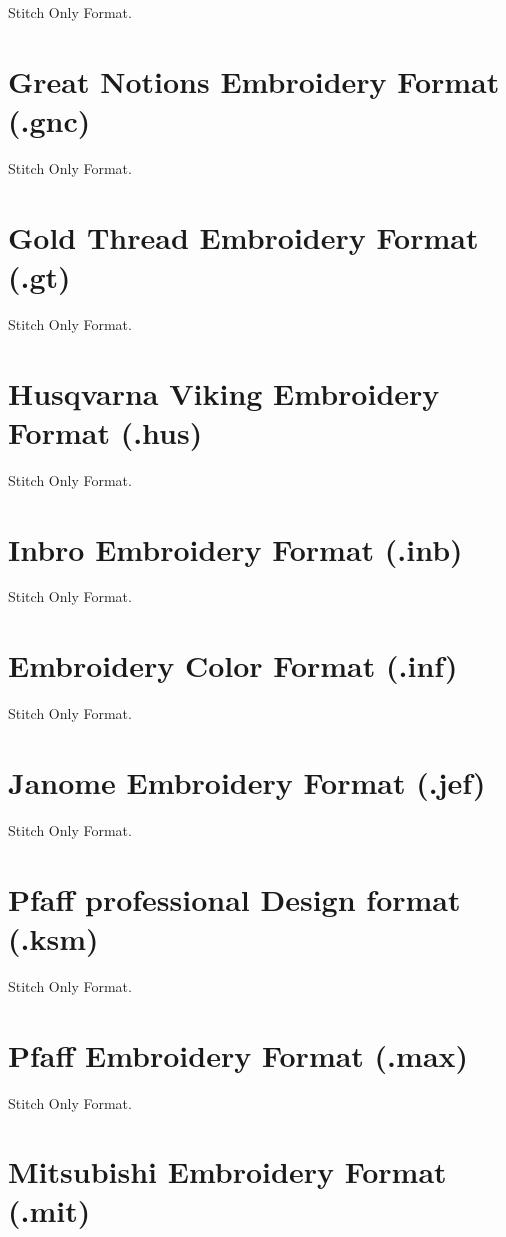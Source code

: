 \documentclass{report}
\begin{document}
Stitch Only Format.

\section{Great Notions Embroidery Format (.gnc)}

Stitch Only Format.

\section{Gold Thread Embroidery Format (.gt)}

Stitch Only Format.

\section{Husqvarna Viking Embroidery Format (.hus)}

Stitch Only Format.

\section{Inbro Embroidery Format (.inb)}

Stitch Only Format.

\section{Embroidery Color Format (.inf)}

Stitch Only Format.

\section{Janome Embroidery Format (.jef)}

Stitch Only Format.

\section{Pfaff professional Design format (.ksm)}

Stitch Only Format.

\section{Pfaff Embroidery Format (.max)}

Stitch Only Format.

\section{Mitsubishi Embroidery Format (.mit)}
\end{document}
